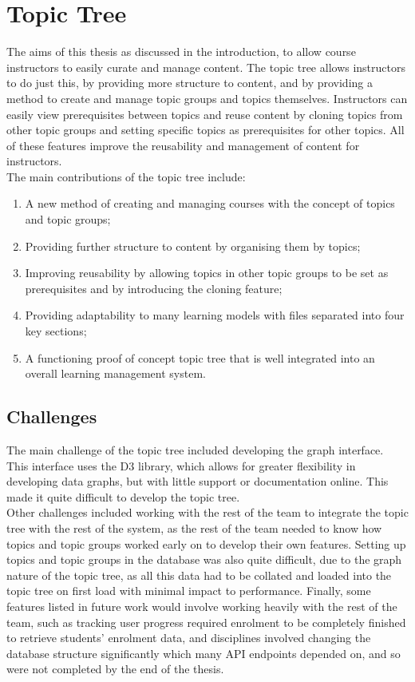 \section{Topic Tree}
The aims of this thesis as discussed in the introduction, to allow course instructors to easily curate and manage content. The topic tree allows instructors to do just this, by providing more structure to content, and by providing a method to create and manage topic groups and topics themselves. Instructors can easily view prerequisites between topics and reuse content by cloning topics from other topic groups and setting specific topics as prerequisites for other topics. All of these features improve the reusability and management of content for instructors.\\

The main contributions of the topic tree include:
\begin{enumerate}
    \item A new method of creating and managing courses with the concept of topics and topic groups;
	\item Providing further structure to content by organising them by topics;
	\item Improving reusability by allowing topics in other topic groups to be set as prerequisites and by introducing the cloning feature;
    \item Providing adaptability to many learning models with files separated into four key sections;
    \item A functioning proof of concept topic tree that is well integrated into an overall learning management system.
\end{enumerate}

\subsection{Challenges}
The main challenge of the topic tree included developing the graph interface. This interface uses the D3 library, which allows for greater flexibility in developing data graphs, but with little support or documentation online. This made it quite difficult to develop the topic tree.\\

Other challenges included working with the rest of the team to integrate the topic tree with the rest of the system, as the rest of the team needed to know how topics and topic groups worked early on to develop their own features. Setting up topics and topic groups in the database was also quite difficult, due to the graph nature of the topic tree, as all this data had to be collated and loaded into the topic tree on first load with minimal impact to performance. Finally, some features listed in future work would involve working heavily with the rest of the team, such as tracking user progress required enrolment to be completely finished to retrieve students' enrolment data, and disciplines involved changing the database structure significantly which many API endpoints depended on, and so were not completed by the end of the thesis. \\

